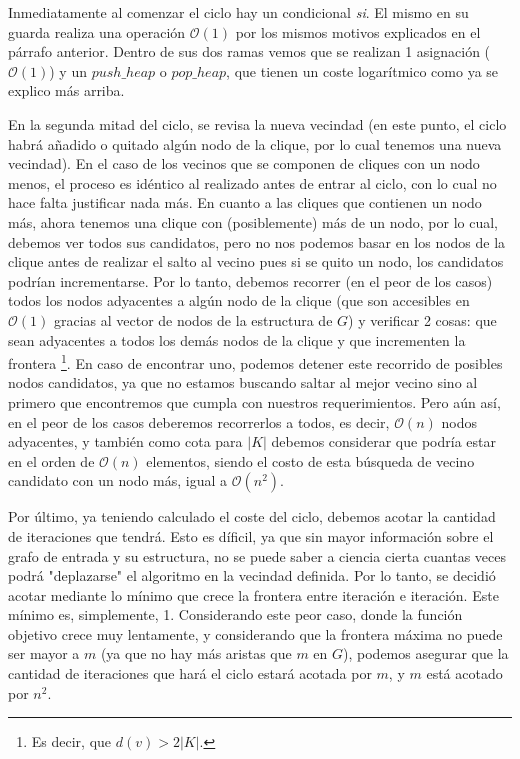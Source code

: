 \par Inmediatamente al comenzar el ciclo hay un condicional
    \emph{si}. El mismo en su guarda realiza una operaci\'on
    $\mathcal O(1)$ por los mismos motivos explicados en
    el p\'arrafo anterior. Dentro de sus dos ramas vemos
    que se realizan 1 asignaci\'on ($\mathcal O(1)$) y
    un $push\_heap$ o $pop\_heap$, que tienen un coste
    logar\'itmico como ya se explico m\'as arriba.

\par En la segunda mitad del ciclo, se
    revisa la nueva vecindad (en este punto, el ciclo
    habr\'a a\~nadido o quitado alg\'un nodo de la
    clique, por lo cual tenemos una nueva vecindad). En
    el caso de los vecinos que se componen de cliques con
    un nodo menos, el proceso es id\'entico al realizado
    antes de entrar al ciclo, con lo cual no hace falta
    justificar nada m\'as. En cuanto a las cliques que
    contienen un nodo m\'as, ahora tenemos una clique
    con (posiblemente) m\'as de un nodo, por lo cual,
    debemos ver todos sus candidatos, pero no nos podemos
    basar en los nodos de la clique antes de realizar
    el salto al vecino pues si se quito un nodo, los
    candidatos podr\'ian incrementarse. Por lo tanto,
    debemos recorrer (en el peor de los casos) todos
    los nodos adyacentes a alg\'un nodo de la clique
    (que son accesibles en $\mathcal O(1)$ gracias al vector
    de nodos de la estructura de $G$) y verificar 2
    cosas: que sean adyacentes a todos los dem\'as
    nodos de la clique y que incrementen la frontera%
    \footnote{Es decir, que $d(v) > 2|K|$.}. En caso
    de encontrar uno, podemos detener este recorrido de posibles
    nodos candidatos, ya que no estamos buscando saltar
    al mejor vecino sino al primero que encontremos
    que cumpla con nuestros requerimientos. Pero a\'un as\'i,
    en el peor de los casos deberemos recorrerlos a todos,
    es decir, $\mathcal O(n)$ nodos adyacentes, y tambi\'en
    como cota para $|K|$ debemos considerar que podr\'ia
    estar en el orden de $\mathcal O(n)$ elementos, siendo
    el costo de esta b\'usqueda de vecino candidato
    con un nodo m\'as, igual a $\mathcal O(n^2)$.

\par Por \'ultimo, ya teniendo calculado el coste del ciclo,
    debemos acotar la cantidad de iteraciones que tendr\'a.
    Esto es d\'ificil, ya que sin mayor informaci\'on sobre
    el grafo de entrada y su estructura, no se puede saber
    a ciencia cierta cuantas veces podr\'a "deplazarse" el
    algoritmo en la vecindad definida. Por lo tanto, se
    decidi\'o acotar mediante lo m\'inimo que crece la frontera
    entre iteraci\'on e iteraci\'on. Este m\'inimo es, simplemente,
    1. Considerando este peor caso, donde la funci\'on objetivo
    crece muy lentamente, y considerando que la frontera m\'axima
    no puede ser mayor a $m$ (ya que no hay m\'as aristas que $m$
    en $G$), podemos asegurar que la cantidad de iteraciones
    que har\'a el ciclo estar\'a acotada por $m$, y $m$ est\'a
    acotado por $n^2$.

